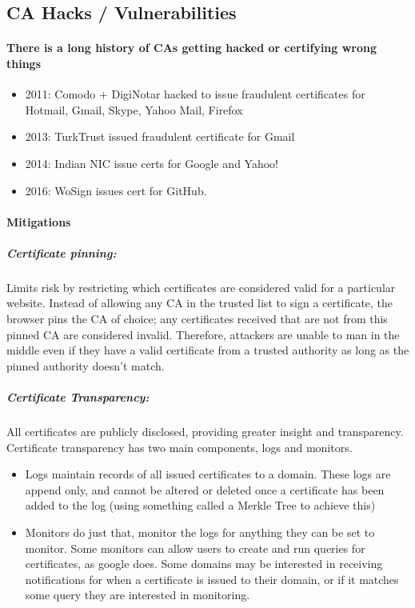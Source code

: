 \documentclass[11pt]{article} %
\begin{document}
\subsection {CA Hacks / Vulnerabilities}
\paragraph{There is a long history of CAs getting hacked or certifying wrong things}
 \begin{itemize}
    \item 2011: Comodo + DigiNotar hacked to issue fraudulent certificates for Hotmail, Gmail, Skype, Yahoo Mail, Firefox
    \item 2013: TurkTrust issued fraudulent certificate for Gmail
    \item 2014: Indian NIC issue certs for Google and Yahoo!
    \item 2016: WoSign issues cert for GitHub.
\end{itemize}
\paragraph{Mitigations}
\subparagraph {Certificate pinning:} Limits risk by restricting which certificates are considered valid for a particular website. Instead of allowing any CA in the trusted list to sign a certificate, the browser pins the CA of choice; any certificates received that are not from this pinned CA are considered invalid. Therefore, attackers are unable to man in the middle even if they have a valid certificate from a trusted authority as long as the pinned authority doesn't match.
\subparagraph {Certificate Transparency:} All certificates are publicly disclosed, providing greater insight and transparency. Certificate transparency has two main components, logs and monitors.
 \begin{itemize}
    \item Logs maintain records of all issued certificates to a domain. These logs are append only, and cannot be altered or deleted once a certificate has been added to the log (using something called a Merkle Tree to achieve this)
    \item Monitors do just that, monitor the logs for anything they can be set to monitor. Some monitors can allow users to create and run queries for certificates, as google does. Some domains may be interested in receiving notifications for when a certificate is issued to their domain, or if it matches some query they are interested in monitoring.
\end{itemize}
\end{document}
